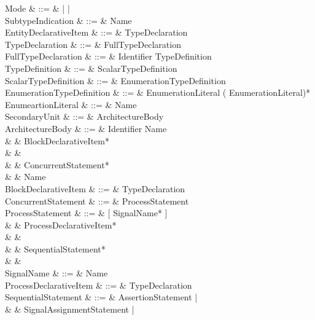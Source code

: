 \begin{VHDLcode}[\footnotesize]
\begin{VHDLlongcode}[\footnotesize]
  Mode & ::= & \VHDLIN{} | \VHDLOUT{} | \VHDLINOUT \\
  SubtypeIndication & ::= & Name \\
  EntityDeclarativeItem & ::= & TypeDeclaration \\
  TypeDeclaration & ::= & FullTypeDeclaration \\
  FullTypeDeclaration & ::= & \VHDLTYPE{} Identifier \VHDLIS{} TypeDefinition \VHDLSemicolon \\
  TypeDefinition & ::= & ScalarTypeDefinition \\
  ScalarTypeDefinition & ::= & EnumerationTypeDefinition \\
  EnumerationTypeDefinition & ::= & \VHDLOpenBracket{} EnumerationLiteral (\VHDLComma{} EnumerationLiteral)* \VHDLCloseBracket{} \\
  EnumeartionLiteral & ::= & Name \\
  SecondaryUnit & ::= & ArchitectureBody \\
  ArchitectureBody & ::= & \VHDLARCHITECTURE{} Identifier \VHDLOF{} Name \VHDLIS \\
                              &      & \VHDLTab BlockDeclarativeItem* \\
                              &      & \VHDLBEGIN \\
                              &      & \VHDLTab ConcurrentStatement* \\
                              &      & \VHDLEND{} Name \VHDLSemicolon \\
  BlockDeclarativeItem & ::= & TypeDeclaration \\
  ConcurrentStatement & ::= & ProcessStatement \\
  ProcessStatement & ::= & \VHDLPROCESS{} [\VHDLOpenBracket{} SignalName* \VHDLCloseBracket{}] \VHDLIS \\
                               &      & \VHDLTab ProcessDeclarativeItem* \\
                               &      & \VHDLBEGIN \\
                               &      & \VHDLTab SequentialStatement* \\
                               &      & \VHDLEND{} \VHDLPROCESS \\
  SignalName & ::= & Name \\
  ProcessDeclarativeItem & ::= & TypeDeclaration \\
  SequentialStatement & ::= & AssertionStatement | \\
                                   &       & SignalAssignmentStatement | \\

\end{VHDLlongcode}
\end{VHDLcode}
